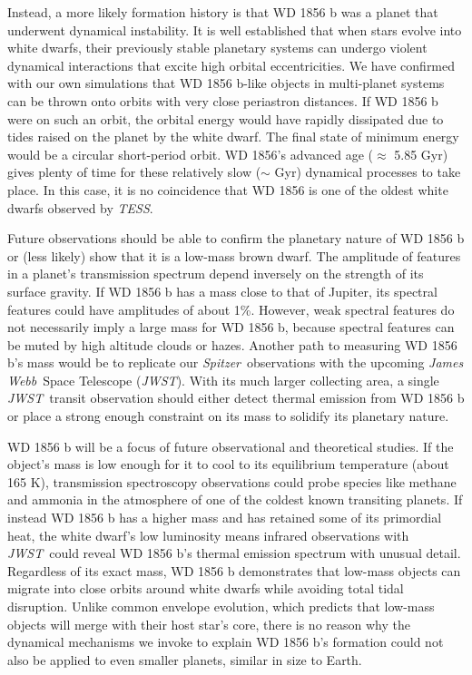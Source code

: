 \documentclass{nature3}
\newcommand*{\bedit}{\textcolor{new_black}}
\newcommand{\project}[1]{\textsl{#1}}
\newcommand{\JWST}{\project{JWST}}
\newcommand{\jameswebb}{\project{James Webb}}
\newcommand{\Spitzer}{\project{Spitzer}}
\newcommand{\TESS}{\project{TESS}}
\begin{document}
\bedit{Instead, a more likely formation history is that} WD 1856 b was a planet that underwent dynamical instability. It is well established that when stars evolve into white dwarfs, their previously stable planetary systems can undergo violent dynamical interactions\cite{debes2002, verasunpacking} that excite high orbital eccentricities. We have confirmed with our own simulations that WD 1856 b-like objects in multi-planet systems can be thrown onto orbits with very close periastron distances. If WD 1856 b were on such an orbit, the orbital energy would have rapidly dissipated due to tides raised on the planet by the white dwarf\cite{Goldreich1966, Veras2019a}. The final state of minimum energy would be a circular short-period orbit. WD 1856's advanced age ($\approx$ 5.85 Gyr) gives plenty of time for these relatively slow ($\sim$ Gyr) dynamical processes to take place. In this \bedit{case}, it is no coincidence that WD 1856 is one of the oldest white dwarfs observed by \TESS. 


Future observations should be able to confirm the planetary nature of WD 1856 b or (less likely) show that it is a low-mass brown dwarf. The amplitude of features in a planet's transmission spectrum depend inversely on the strength of its surface gravity. If WD 1856 b has a mass close to that of Jupiter, its spectral features could have amplitudes of about 1\%. However, weak spectral features do not necessarily imply a large mass for WD 1856 b, because spectral features can be muted by high altitude clouds or hazes\cite{kreidberg14}. Another path to measuring WD 1856 b's mass would be to replicate our \Spitzer\ observations with the upcoming \jameswebb\ Space Telescope (\JWST). With its much larger collecting area, a single \JWST\ transit observation should either detect thermal emission from WD 1856 b or place a strong enough constraint on its mass to solidify its planetary nature.

WD 1856 b will be a focus of future observational and theoretical studies. If the object's mass is low enough for it to cool to its equilibrium temperature (about 165 K), transmission spectroscopy observations could probe species like methane and ammonia in the atmosphere of one of the coldest known transiting planets\cite{akeson2013}. 
If instead WD 1856 b has a higher mass and has retained some of its primordial heat, the white dwarf's low luminosity means infrared observations with \JWST\ could reveal WD 1856 b's thermal emission spectrum with unusual detail. Regardless of its exact mass, WD 1856 b demonstrates that low-mass objects can migrate into close orbits around white dwarfs while avoiding total tidal disruption. Unlike common envelope evolution, which predicts that low-mass objects will merge with their host star's core, there is no reason why the dynamical mechanisms we invoke to explain WD 1856 b's formation could not also be applied to even smaller planets, similar in size to Earth\cite{agol2011}. 
\end{document}
